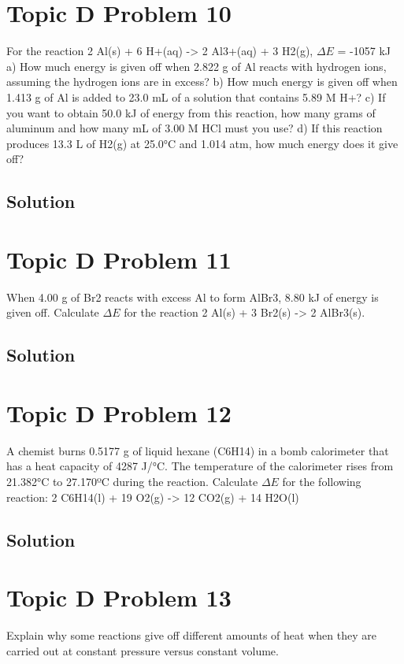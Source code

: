 \documentclass[10pt]{article}
\begin{document}
    \section{Topic D Problem 10}
        For the reaction 2 Al(s) + 6 H+(aq) -> 2 Al3+(aq) + 3 H2(g), $\Delta E$ = -1057 kJ
a) How much energy is given off when 2.822 g of Al reacts with hydrogen ions, assuming
the hydrogen ions are in excess?
b) How much energy is given off when 1.413 g of Al is added to 23.0 mL of a solution that
contains 5.89 M H+?
c) If you want to obtain 50.0 kJ of energy from this reaction, how many grams of aluminum
and how many mL of 3.00 M HCl must you use?
d) If this reaction produces 13.3 L of H2(g) at 25.0\unit{\celsius} and 1.014 atm, how much energy does
it give off?
        
        \subsection{Solution}

    \pagebreak
    \section{Topic D Problem 11}
        When 4.00 g of Br2 reacts with excess Al to form AlBr3, 8.80 kJ of energy is given off.
        Calculate $\Delta E$ for the reaction 2 Al(s) + 3 Br2(s) -> 2 AlBr3(s).
        
        \subsection{Solution}

    \pagebreak
    \section{Topic D Problem 12}
        A chemist burns 0.5177 g of liquid hexane (C6H14) in a bomb calorimeter that has a heat
capacity of 4287 J/\unit{\celsius}. The temperature of the calorimeter rises from 21.382\unit{\celsius} to 27.170ºC
during the reaction. Calculate $\Delta E$ for the following reaction:
2 C6H14(l) + 19 O2(g) -> 12 CO2(g) + 14 H2O(l)
        
        \subsection{Solution}

    \pagebreak
    \section{Topic D Problem 13}
        Explain why some reactions give off different amounts of heat when they are carried out at constant pressure versus constant volume.
        
\end{document}
